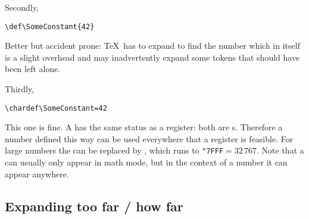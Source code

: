 \documentclass[twoside,letterpaper,openright]{rapport3}
\begin{document}
Secondly,
\begin{verbatim}
\def\SomeConstant{42}
\end{verbatim}
Better but accident prone: \TeX\ has to expand to find the number
 \ldash which in itself is a slight overhead \rdash  and may inadvertently
expand some tokens that should have been left alone.

Thirdly,
\begin{verbatim}
\chardef\SomeConstant=42
\end{verbatim}
This one is fine.
A  has the same status as a 
register: both are s.
Therefore a number defined this way can be used everywhere that
a  register is feasible.
For large numbers the  can be replaced by ,
which runs to \verb>"7FFF>${}=32\,767$.
Note that a  can usually only appear
in math mode, but in the context of a number it can appear anywhere.

\subsection{Expanding too far / how far}
\end{document}
